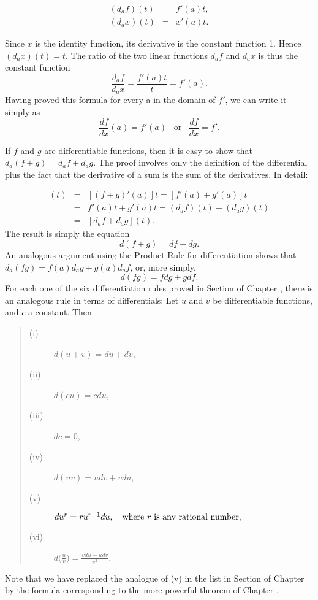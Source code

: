 \begin{example}
\begin{eqnarray*}
(d_{a}f)(t) &=& f'(a)t, \\
(d_{a}x)(t) &=& x'(a)t.
\end{eqnarray*}

\noindent Since $x$ is the identity function, its derivative is the constant function 1. Hence $(d_{a}x)(t) = t.$ The ratio of the two linear functions $d_{a}f$ and $d_{a}x$ is thus the constant function
$$
\frac{d_{a}f}{d_{a}x} = \frac{f'(a)t}{t} = f'(a).
$$
Having proved this formula for every a in the domain of $f'$, we can write it simply as
$$
\frac{df}{dx} (a) = f'(a) \;\;\; \mbox{or} \;\;\; \frac{df}{dx} = f'.
$$

If $f$ and $g$ are differentiable functions, then it is easy to show that $d_{a}(f + g) = d_{a}f + d_{a}g$. The proof involves only the definition of the differential plus the fact that the derivative of a sum is the sum of the derivatives. In detail:

\begin{eqnarray*}
[d_{a}(f + g)](t) &=& [(f + g)'(a)] t = [f' (a) + g'(a)] t\\
                         &=& f'(a)t + g'(a)t = (d_{a}f)(t) + (d_{a}g)(t)\\
                         &=& [d_{a}f + d_{a}g](t) .
\end{eqnarray*}
The result is simply the equation
$$
d(f + g) = df + dg.
$$
An analogous argument using the Product Rule for differentiation shows that $d_{a}(fg) = f(a)d_{a}g + g(a)d_{a}f$, or, more simply,
$$
d(fg) = f dg + g df.
$$
For each one of the six differentiation rules 
proved in Section  of Chapter ,
there is an analogous rule in terms of differentials:
Let $u$ and $v$ be differentiable functions, and $c$ a constant. Then
\begin{prop}
\label{thm drules}
\begin{quote}
\begin{description}
\item [(i)] $d(u + v) = du + dv$,
\item [(ii)] $d(cu)= cdu$,
\item [(iii)] $dc= 0$,
\label{eq2.6.iv}
\item [(iv)] $d(uv) = u dv + v du$,
\label{eq2.6.v}
\item [(v)]
$du^r = ru^{r-1}du, \quad \mbox{where $r$ is any rational number,}$  
\item [(vi)] $d \biggl(\frac{u}{v} \biggr) = \frac{vdu - udv}{v^2}$.
\end{description}
\end{quote} 
\end{prop}

Note that we have replaced the analogue of (v)
in the list in Section  of Chapter 
by the formula corresponding to the more powerful theorem
 of Chapter .
\end{example}

